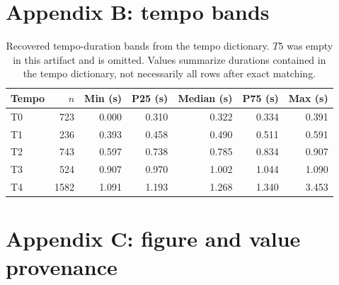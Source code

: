 \documentclass[11pt]{article}
\begin{document}
\section{Appendix B: tempo bands}

\begin{table}[H]
\centering
\caption{Recovered tempo-duration bands from the tempo dictionary. $T5$ was empty in this artifact and is omitted. Values summarize durations contained in the tempo dictionary, not necessarily all rows after exact matching.}
\label{tab:tempo_bands}
\begin{tabular}{lrrrrrr}
\toprule
Tempo & $n$ & Min (s) & P25 (s) & Median (s) & P75 (s) & Max (s) \\
\midrule
T0 & 723 & 0.000 & 0.310 & 0.322 & 0.334 & 0.391 \\
T1 & 236 & 0.393 & 0.458 & 0.490 & 0.511 & 0.591 \\
T2 & 743 & 0.597 & 0.738 & 0.785 & 0.834 & 0.907 \\
T3 & 524 & 0.907 & 0.970 & 1.002 & 1.044 & 1.090 \\
T4 & 1582 & 1.091 & 1.193 & 1.268 & 1.340 & 3.453 \\
\bottomrule
\end{tabular}
\end{table}

\section{Appendix C: figure and value provenance}
\end{document}
